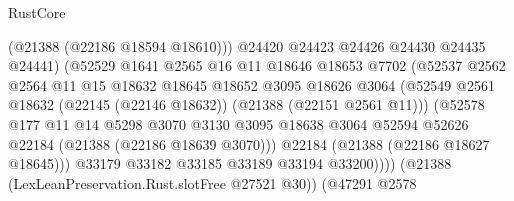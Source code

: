 \begin{lexlean}{RustCore}
\begin{coremodule}
                                      (@21388 (@22186 @18594 @18610)))
                                    @24420
                                    @24423
                                    @24426
                                    @24430
                                    @24435
                                    @24441)
                                  (@52529
                                    @1641
                                    @2565
                                    @16
                                    @11
                                    @18646
                                    @18653
                                    @7702
                                    (@52537
                                      @2562
                                      @2564
                                      @11
                                      @15
                                      @18632
                                      @18645
                                      @18652
                                      @3095
                                      @18626
                                      @3064
                                      (@52549
                                        @2561
                                        @18632
                                        (@22145 (@22146 @18632))
                                        (@21388 (@22151 @2561 @11)))
                                      (@52578
                                        @177
                                        @11
                                        @14
                                        @5298
                                        @3070
                                        @3130
                                        @3095
                                        @18638
                                        @3064
                                        @52594
                                        @52626
                                        @22184
                                        (@21388 (@22186 @18639 @3070)))
                                      @22184
                                      (@21388 (@22186 @18627 @18645)))
                                    @33179
                                    @33182
                                    @33185
                                    @33189
                                    @33194
                                    @33200))))
                            (@21388 (LexLeanPreservation.Rust.slotFree @27521 @30))
                            (@47291
                              @2578

\end{coremodule}
\end{lexlean}
